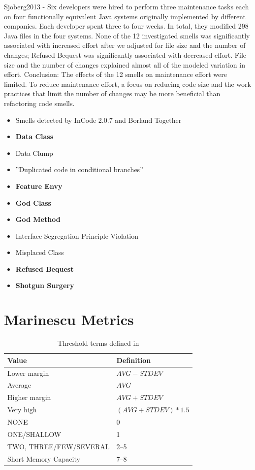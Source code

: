 \documentclass{article}
\begin{document}
Sjoberg2013 - Six developers were hired to perform three maintenance tasks each on four functionally equivalent Java systems originally implemented by different companies. Each developer spent three to four weeks. In total, they modified 298 Java files in the four systems. None of the 12 investigated smells was significantly associated with increased effort after we adjusted for file size and the number of changes; Refused Bequest was significantly associated with decreased effort. File size and the number of changes explained almost all of the modeled variation in effort. Conclusion: The effects of the 12 smells on maintenance effort were limited. To reduce maintenance effort, a focus on reducing code size and the work practices that limit the number of changes may be more beneficial than refactoring code smells.\cite{Sjoberg2013}
\begin{itemize}
\item Smells detected by InCode 2.0.7 and Borland Together
\item \textbf{Data Class}
\item Data Clump
\item ''Duplicated code in conditional branches''
\item \textbf{Feature Envy}
\item \textbf{God Class}
\item \textbf{God Method}
\item Interface Segregation Principle Violation
\item Misplaced Class
\item \textbf{Refused Bequest}
\item \textbf{Shotgun Surgery}
\end{itemize}




\clearpage


\section{Marinescu Metrics}



\begin{table}[h]
\centering
\begin{tabular}{l|l}
 Value & Definition \\
 \toprule
 Lower margin & $AVG - STDEV$\\
 Average & $AVG$\\
 Higher margin & $AVG + STDEV$ \\
 Very high & $(AVG + STDEV) * 1.5$ \\
 \midrule
 NONE & 0 \\
 ONE/SHALLOW & 1 \\
 TWO, THREE/FEW/SEVERAL & 2--5 \\
 Short Memory Capacity & 7--8
\end{tabular}
\caption{Threshold terms defined in \cite{Lanza2006}}
\label{tab:thresholds}
\end{table}
\end{document}
